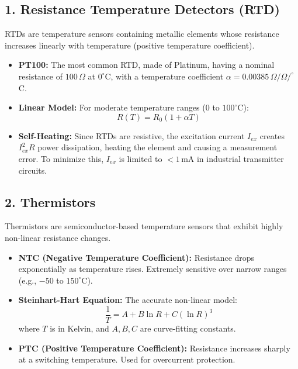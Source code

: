 \documentclass[12pt,a4paper]{article}
\begin{document}
\subsection{1. Resistance Temperature Detectors (RTD)}
RTDs are temperature sensors containing metallic elements whose resistance increases linearly with temperature (positive temperature coefficient).
\begin{itemize}[leftmargin=*, itemsep=2pt]
  \item \textbf{PT100:} The most common RTD, made of Platinum, having a nominal resistance of $100\,\Omega$ at $0^\circ$C, with a temperature coefficient $\alpha = 0.00385\,\Omega/\Omega/^\circ$C.
  \item \textbf{Linear Model:} For moderate temperature ranges ($0$ to $100^\circ$C):
  \[
  R(T) = R_0 (1 + \alpha T)
  \]
  \item \textbf{Self-Heating:} Since RTDs are resistive, the excitation current $I_{ex}$ creates $I_{ex}^2 R$ power dissipation, heating the element and causing a measurement error. To minimize this, $I_{ex}$ is limited to $< 1\,$mA in industrial transmitter circuits.
\end{itemize}

\subsection{2. Thermistors}
Thermistors are semiconductor-based temperature sensors that exhibit highly non-linear resistance changes.
\begin{itemize}[leftmargin=*, itemsep=2.5pt]
  \item \textbf{NTC (Negative Temperature Coefficient):} Resistance drops exponentially as temperature rises. Extremely sensitive over narrow ranges (e.g., $-50$ to $150^\circ$C).
  \item \textbf{Steinhart-Hart Equation:} The accurate non-linear model:
  \[
  \frac{1}{T} = A + B \ln R + C (\ln R)^3
  \]
  where $T$ is in Kelvin, and $A, B, C$ are curve-fitting constants.
  \item \textbf{PTC (Positive Temperature Coefficient):} Resistance increases sharply at a switching temperature. Used for overcurrent protection.
\end{itemize}
\end{document}
